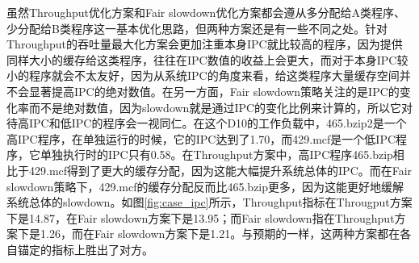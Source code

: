虽然Throughput优化方案和Fair slowdown优化方案都会遵从多分配给A类程序、少分配给B类程序这一基本优化思路，但两种方案还是有一些不同之处。针对Throughput的吞吐量最大化方案会更加注重本身IPC就比较高的程序，因为提供同样大小的缓存给这类程序，往往在IPC数值的收益上会更大，而对于本身IPC较小的程序就会不太友好，因为从系统IPC的角度来看，给这类程序大量缓存空间并不会显著提高IPC的绝对数值。在另一方面，Fair slowdown策略关注的是IPC的变化率而不是绝对数值，因为slowdown就是通过IPC的变化比例来计算的，所以它对待高IPC和低IPC的程序会一视同仁。在这个D10的工作负载中，465.bzip2是一个高IPC程序，在单独运行的时候，它的IPC达到了1.70，而429.mcf是一个低IPC程序，它单独执行时的IPC只有0.58。在Throughput方案中，高IPC程序465.bzip相比于429.mcf得到了更大的缓存分配，因为这能大幅提升系统总体的IPC。而在Fair slowdown策略下，429.mcf的缓存分配反而比465.bzip更多，因为这能更好地缓解系统总体的slowdown。如图\ref{fig:case_ipc}所示，Throughput指标在Througput方案下是14.87，在Fair slowdown方案下是13.95；而Fair slowdown指在Throughput方案下是1.26，而在Fair slowdown方案下是1.21。与预期的一样，这两种方案都在各自锚定的指标上胜出了对方。